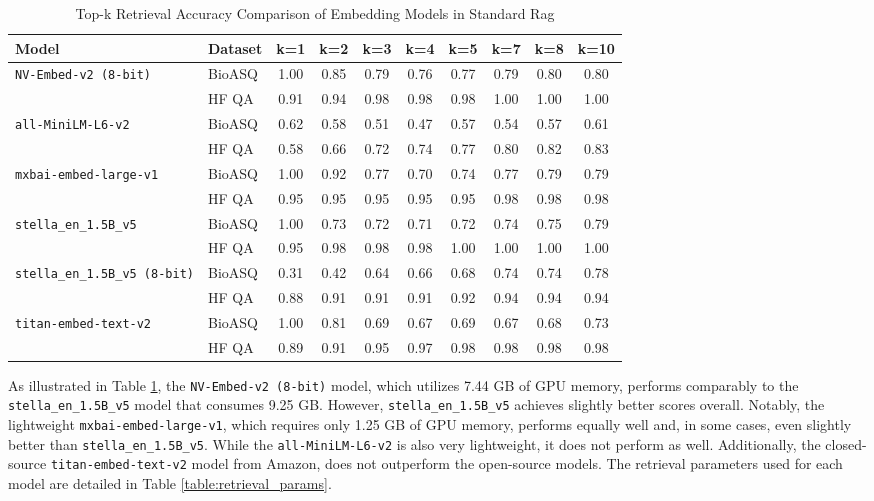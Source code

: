 \documentclass{scrartcl}
\begin{document}
\begin{table}[H]
\centering
\small
\begin{tabular}{l l c c c c c c c c}
\hline
\textbf{Model} & \textbf{Dataset} & \textbf{k=1} & \textbf{k=2} & \textbf{k=3} & \textbf{k=4} & \textbf{k=5} & \textbf{k=7} & \textbf{k=8} & \textbf{k=10} \\
\hline
\multirow{2}{*}{\texttt{NV-Embed-v2 (8-bit)}} 
 & BioASQ & 1.00 & 0.85 & 0.79 & 0.76 & 0.77 & 0.79 & 0.80 & 0.80 \\
 & HF QA  & 0.91 & 0.94 & 0.98 & 0.98 & 0.98 & 1.00 & 1.00 & 1.00 \\
\hline
\multirow{2}{*}{\texttt{all-MiniLM-L6-v2}} 
 & BioASQ & 0.62 & 0.58 & 0.51 & 0.47 & 0.57 & 0.54 & 0.57 & 0.61 \\
 & HF QA  & 0.58 & 0.66 & 0.72 & 0.74 & 0.77 & 0.80 & 0.82 & 0.83 \\
\hline
\multirow{2}{*}{\texttt{mxbai-embed-large-v1}} 
 & BioASQ & 1.00 & 0.92 & 0.77 & 0.70 & 0.74 & 0.77 & 0.79 & 0.79 \\
 & HF QA  & 0.95 & 0.95 & 0.95 & 0.95 & 0.95 & 0.98 & 0.98 & 0.98 \\
\hline
\multirow{2}{*}{\texttt{stella\_en\_1.5B\_v5}} 
 & BioASQ & 1.00 & 0.73 & 0.72 & 0.71 & 0.72 & 0.74 & 0.75 & 0.79 \\
 & HF QA  & 0.95 & 0.98 & 0.98 & 0.98 & 1.00 & 1.00 & 1.00 & 1.00 \\
\hline
\multirow{2}{*}{\texttt{stella\_en\_1.5B\_v5 (8-bit)}} 
 & BioASQ & 0.31 & 0.42 & 0.64 & 0.66 & 0.68 & 0.74 & 0.74 & 0.78 \\
 & HF QA  & 0.88 & 0.91 & 0.91 & 0.91 & 0.92 & 0.94 & 0.94 & 0.94 \\
\hline
\multirow{2}{*}{\texttt{titan-embed-text-v2}} 
 & BioASQ & 1.00 & 0.81 & 0.69 & 0.67 & 0.69 & 0.67 & 0.68 & 0.73 \\
 & HF QA  & 0.89 & 0.91 & 0.95 & 0.97 & 0.98 & 0.98 & 0.98 & 0.98 \\
\hline
\end{tabular}
\caption{Top-k Retrieval Accuracy Comparison of Embedding Models in Standard Rag}
\label{table:top_k_retrieval_accuracy_table}
\end{table}

As illustrated in Table \ref{table:top_k_retrieval_accuracy_table}, the \texttt{NV-Embed-v2 (8-bit)} model, which utilizes 7.44 GB of GPU memory, performs comparably to the \texttt{stella\_en\_1.5B\_v5} model that consumes 9.25 GB. However, \texttt{stella\_en\_1.5B\_v5} achieves slightly better scores overall. Notably, the lightweight \texttt{mxbai-embed-large-v1}, which requires only 1.25 GB of GPU memory, performs equally well and, in some cases, even slightly better than \texttt{stella\_en\_1.5B\_v5}. While the \texttt{all-MiniLM-L6-v2} is also very lightweight, it does not perform as well. Additionally, the closed-source \texttt{titan-embed-text-v2} model from Amazon, does not outperform the open-source models. The retrieval parameters used for each model are detailed in Table \ref{table:retrieval_params}.
\end{document}
